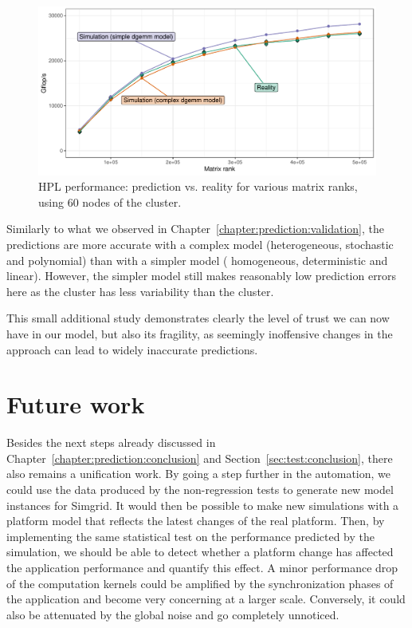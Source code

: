         \begin{figure}[htpb]
            \centering
            \includegraphics[width=\linewidth]{img/conclusion/validation_gros.pdf}
            \caption{HPL performance: prediction vs. reality for various matrix ranks, using 60 nodes of the \gros
            cluster.}%
            \label{fig:conclusion:gros_study}
        \end{figure}

        Similarly to what we observed in Chapter~\ref{chapter:prediction:validation}, the predictions are more accurate
        with a complex \dgemm model (\ie heterogeneous, stochastic and polynomial)  than with a simpler model (\ie
        homogeneous, deterministic and linear). However, the simpler model still makes reasonably low prediction errors
        here as the \gros cluster has less variability than the \dahu cluster.

        This small additional study demonstrates clearly the level of trust we can now have in our model, but also its
        fragility, as seemingly inoffensive changes in the approach can lead to widely inaccurate predictions.

    \section{Future work}%

        Besides the next steps already discussed in Chapter~\ref{chapter:prediction:conclusion} and
        Section~\ref{sec:test:conclusion}, there also remains a unification work. By going a step further in the
        automation, we could use the data produced by the non-regression tests to generate new model instances for
        Simgrid. It would then be possible to make new simulations with a platform model that reflects the latest
        changes of the real platform. Then, by implementing the same statistical test on the performance predicted by
        the simulation, we should be able to detect whether a platform change has affected the application
        performance and quantify this effect. A minor performance drop of the computation kernels could be amplified by
        the synchronization phases of the application and become very concerning at a larger scale. Conversely, it could
        also be attenuated by the global noise and go completely unnoticed.

